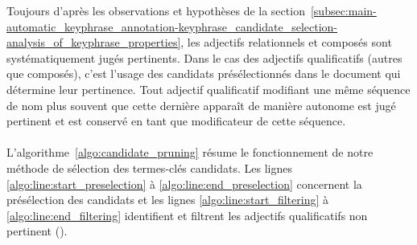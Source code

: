         Toujours d'après les observations et hypothèses de la
        section~\ref{subsec:main-automatic_keyphrase_annotation-keyphrase_candidate_selection-analysis_of_keyphrase_properties},
        les adjectifs relationnels et composés sont systématiquement jugés
        pertinents. Dans le cas des adjectifs qualificatifs (autres que
        composés), c'est l'usage des candidats présélectionnés dans le document
        qui détermine leur pertinence. Tout adjectif qualificatif modifiant une
        même séquence de nom plus souvent que cette dernière apparaît de manière
        autonome est jugé pertinent et est conservé en tant que modificateur de
        cette séquence.

        \paragraph{}
        L'algorithme~\ref{algo:candidate_pruning} résume le
        fonctionnement de notre méthode de sélection des termes-clés candidats.
        Les lignes \ref{algo:line:start_preselection} à
        \ref{algo:line:end_preselection} concernent la présélection des
        candidats et les lignes \ref{algo:line:start_filtering} à
        \ref{algo:line:end_filtering} identifient et filtrent les adjectifs
        qualificatifs non pertinent ().
